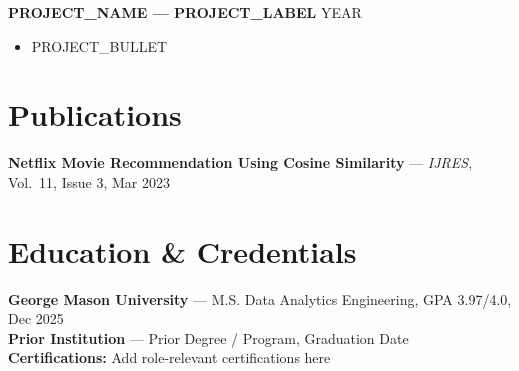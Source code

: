 \documentclass[letterpaper,9pt]{article}
\begin{document}
	\textbf{PROJECT_NAME --- PROJECT_LABEL} \hfill YEAR
	\begin{itemize}
		\item PROJECT_BULLET
	\end{itemize}


	\section*{Publications}
	\textbf{Netflix Movie Recommendation Using Cosine Similarity} --- \textit{IJRES}, Vol.\ 11, Issue 3, Mar 2023


	\section*{Education \& Credentials}
	\textbf{George Mason University} --- M.S. Data Analytics Engineering, GPA 3.97/4.0, Dec 2025 \\
	\textbf{Prior Institution} --- Prior Degree / Program, Graduation Date \\
	\textbf{Certifications:} Add role-relevant certifications here
\end{document}

